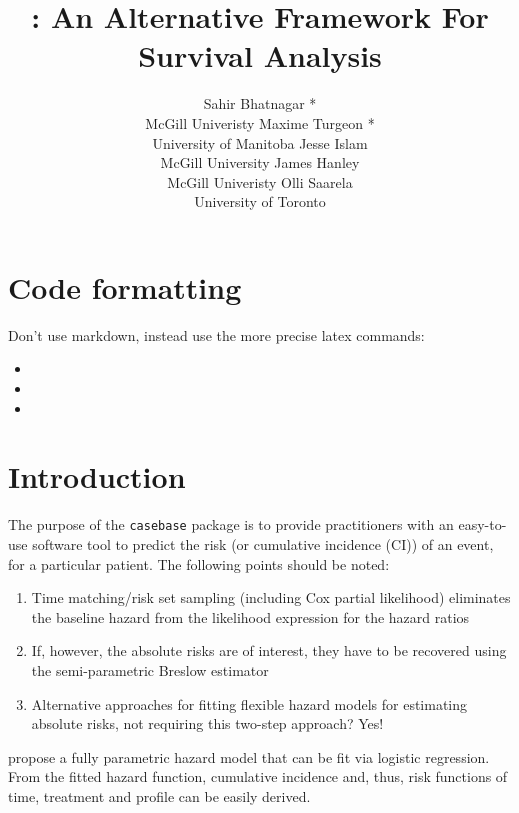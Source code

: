 \documentclass[
]{jss}
\author{
Sahir Bhatnagar *\\McGill Univeristy \And Maxime Turgeon *\\University of Manitoba \AND Jesse Islam\\McGill University \And James Hanley\\McGill Univeristy \And Olli Saarela\\University of Toronto
}
\title{\pkg{casebase}: An Alternative Framework For Survival Analysis}
\providecommand{\tightlist}{%
  \setlength{\itemsep}{0pt}\setlength{\parskip}{0pt}}
\begin{document}
\hypertarget{code-formatting}{%
\section*{Code formatting}\label{code-formatting}}

Don't use markdown, instead use the more precise latex commands:

\begin{itemize}
\item
\item
\item
\end{itemize}

\hypertarget{introduction}{%
\section{Introduction}\label{introduction}}

The purpose of the \texttt{casebase} package is to provide practitioners
with an easy-to-use software tool to predict the risk (or cumulative
incidence (CI)) of an event, for a particular patient. The following
points should be noted:

\begin{enumerate}
\def\labelenumi{\arabic{enumi}.}
\tightlist
\item
  Time matching/risk set sampling (including Cox partial likelihood)
  eliminates the baseline hazard from the likelihood expression for the
  hazard ratios
\item
  If, however, the absolute risks are of interest, they have to be
  recovered using the semi-parametric Breslow estimator
\item
  Alternative approaches for fitting flexible hazard models for
  estimating absolute risks, not requiring this two-step approach? Yes!
  \citep{hanley2009fitting}
\end{enumerate}

\citep{hanley2009fitting} propose a fully parametric hazard model that
can be fit via logistic regression. From the fitted hazard function,
cumulative incidence and, thus, risk functions of time, treatment and
profile can be easily derived.
\end{document}
